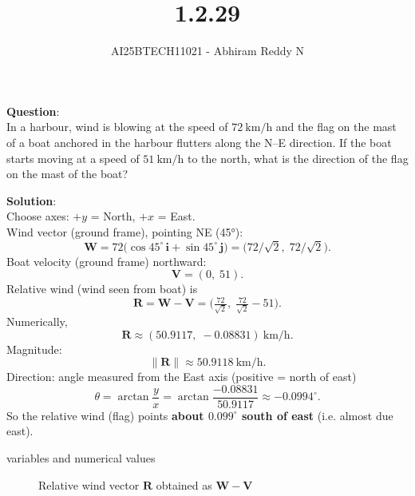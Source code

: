\documentclass[journal]{IEEEtran}
\begin{document}

\vspace{3cm}

\title{1.2.29}
\author{AI25BTECH11021 - Abhiram Reddy N}
{\let\newpage\relax\maketitle}

\renewcommand{\thefigure}{\theenumi}
\renewcommand{\thetable}{\theenumi}
\setlength{\intextsep}{10pt} %


\renewcommand{\thetable}{\theenumi}


\textbf{Question}:\\In a harbour, wind is blowing at the speed of $72\ \mathrm{km/h}$ and the flag on the mast of a boat anchored in the harbour flutters along the N--E direction. If the boat starts moving at a speed of $51\ \mathrm{km/h}$ to the north, what is the direction of the flag on the mast of the boat?


\textbf{Solution}:\\
Choose axes: $+\!y$ = North, $+\!x$ = East. \\
Wind vector (ground frame), pointing NE (45°):
\[
\mathbf{W}=72\big(\cos 45^\circ\,\mathbf{i}+\sin 45^\circ\,\mathbf{j}\big)
= \big(72/\sqrt2,\;72/\sqrt2\big).
\]
Boat velocity (ground frame) northward:
\[
\mathbf{V}=(0,\;51).
\]
Relative wind (wind seen from boat) is
\[
\mathbf{R}=\mathbf{W}-\mathbf{V}
=\Big(\tfrac{72}{\sqrt2},\;\tfrac{72}{\sqrt2}-51\Big).
\]
Numerically,
\[
\mathbf{R}\approx(50.9117,\; -0.08831)\ \mathrm{km/h}.
\]
Magnitude:
\[
\|\mathbf{R}\| \approx 50.9118\ \mathrm{km/h}.
\]
Direction: angle measured from the East axis (positive = north of east)
\[
\theta=\arctan\frac{y}{x}=\arctan\frac{-0.08831}{50.9117}\approx -0.0994^\circ.
\]
So the relative wind (flag) points \textbf{about $0.099^\circ$ south of east} (i.e. almost due east).



\begin{table}[h!]    
      \centering
      
      \caption{variables and numerical values}
    \end{table}


\begin{figure}[htbp]
\centering
\caption{Relative wind vector $\mathbf{R}$ obtained as $\mathbf{W}-\mathbf{V}$}
\label{fig:wind}
\end{figure}
\end{document}
